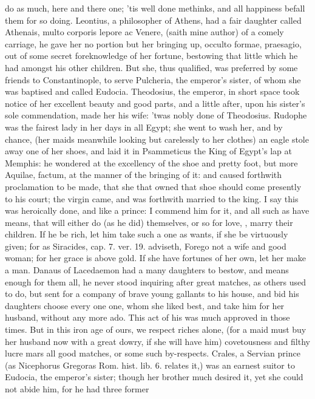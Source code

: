 do as much, here and there one; 'tis well done methinks, and all
happiness befall them for so doing. Leontius, a philosopher of
Athens, had a fair daughter called Athenais, multo corporis lepore ac
Venere, (saith mine author) of a comely carriage, he gave her no
portion but her bringing up, occulto formae, praesagio, out of some
secret foreknowledge of her fortune, bestowing that little which he had
amongst his other children. But she, thus qualified, was preferred by
some friends to Constantinople, to serve Pulcheria, the emperor's
sister, of whom she was baptised and called Eudocia. Theodosius, the
emperor, in short space took notice of her excellent beauty and good
parts, and a little after, upon his sister's sole commendation, made
her his wife: 'twas nobly done of Theodosius. Rudophe was the
fairest lady in her days in all Egypt; she went to wash her, and by
chance, (her maids meanwhile looking but carelessly to her clothes) an
eagle stole away one of her shoes, and laid it in Psammeticus the King
of Egypt's lap at Memphis: he wondered at the excellency of the shoe
and pretty foot, but more Aquilae, factum, at the manner of the
bringing of it: and caused forthwith proclamation to be made, that she
that owned that shoe should come presently to his court; the virgin
came, and was forthwith married to the king. I say this was heroically
done, and like a prince: I commend him for it, and all such as have
means, that will either do (as he did) themselves, or so for love, \etc{},
marry their children. If he be rich, let him take such a one as wants,
if she be virtuously given; for as Siracides, cap. 7. ver. 19.
adviseth, Forego not a wife and good woman; for her grace is above
gold. If she have fortunes of her own, let her make a man. Danaus of
Lacedaemon had a many daughters to bestow, and means enough for them
all, he never stood inquiring after great matches, as others used to
do, but sent for a company of brave young gallants to his house,
and bid his daughters choose every one one, whom she liked best, and
take him for her husband, without any more ado. This act of his was
much approved in those times. But in this iron age of ours, we respect
riches alone, (for a maid must buy her husband now with a great dowry,
if she will have him) covetousness and filthy lucre mars all good
matches, or some such by-respects. Crales, a Servian prince (as
Nicephorus Gregoras Rom. hist. lib. 6. relates it,) was an earnest
suitor to Eudocia, the emperor's sister; though her brother much
desired it, yet she could not abide him, for he had three former

